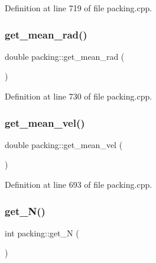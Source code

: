 Definition at line 719 of file packing.\+cpp.

\mbox{\label{classpacking_ace5de1e50143754b63f3922ed9dcd646}} 
\subsubsection{\texorpdfstring{get\+\_\+mean\+\_\+rad()}{get\_mean\_rad()}}
{\footnotesize\ttfamily double packing\+::get\+\_\+mean\+\_\+rad (\begin{DoxyParamCaption}{ }\end{DoxyParamCaption})}



Definition at line 730 of file packing.\+cpp.

\mbox{\label{classpacking_a72af770ca74d1b7cf93301210b4aee63}} 
\subsubsection{\texorpdfstring{get\+\_\+mean\+\_\+vel()}{get\_mean\_vel()}}
{\footnotesize\ttfamily double packing\+::get\+\_\+mean\+\_\+vel (\begin{DoxyParamCaption}{ }\end{DoxyParamCaption})}



Definition at line 693 of file packing.\+cpp.

\mbox{\label{classpacking_addc33dab6e59ce3a959b1987ac0a4fce}} 
\subsubsection{\texorpdfstring{get\+\_\+\+N()}{get\_N()}}
{\footnotesize\ttfamily int packing\+::get\+\_\+N (\begin{DoxyParamCaption}{ }\end{DoxyParamCaption})\hspace{0.3cm}{\ttfamily [inline]}}



